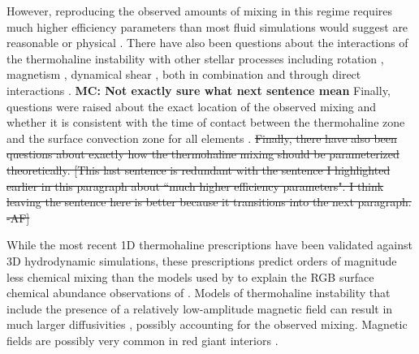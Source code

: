 However, reproducing the observed amounts of mixing in this regime requires much higher efficiency parameters than most fluid simulations would suggest are reasonable or physical %
\citep{Denissenkov2010thermohaline, denissenkov_merryfield_2011, traxler_etal_2011, brown_etal_2013}. There have also been questions about the interactions of the thermohaline instability with other stellar processes
including rotation \citep{Lagarde2011}, magnetism \citep{harrington}, 
dynamical shear \citep{CantielloLanger2010}, both in combination and through direct interactions \citep{Maeder2013, SenguptaGaraud2018,harrington}. 
\textbf{MC: Not exactly sure what next sentence mean}
Finally, questions were raised about the exact location of the observed mixing and whether it is consistent with the time of contact between the thermohaline zone and the surface convection zone for all elements \citep[see e.g.][]{Angelou2015, Henkel2017, TayarJoyce22}.
\sout{Finally, there have also been questions about exactly how the thermohaline mixing should be parameterized theoretically. 
[This last sentence is redundant with the sentence I highlighted earlier in this paragraph about ``much higher efficiency parameters". I think leaving the sentence here is better because it transitions into the next paragraph. -AF]}

%

While the most recent 1D thermohaline prescriptions \citep[e.g.~][]{traxler_etal_2011,brown_etal_2013} have been validated against 3D hydrodynamic simulations, these prescriptions predict orders of magnitude less chemical mixing than the models used by \citet{charbonnel_thermohaline_2007} to explain the RGB surface chemical abundance observations of \citet{Gratton2000} \citep[see Sec.~3.1 of][]{traxler_etal_2011}. 
Models of thermohaline instability that include the presence of a relatively low-amplitude magnetic field can result in much larger diffusivities \citep{harrington}, possibly accounting for the observed mixing. Magnetic fields are possibly very common in red giant interiors \citep{Fuller2015,Stello:2016}. 

